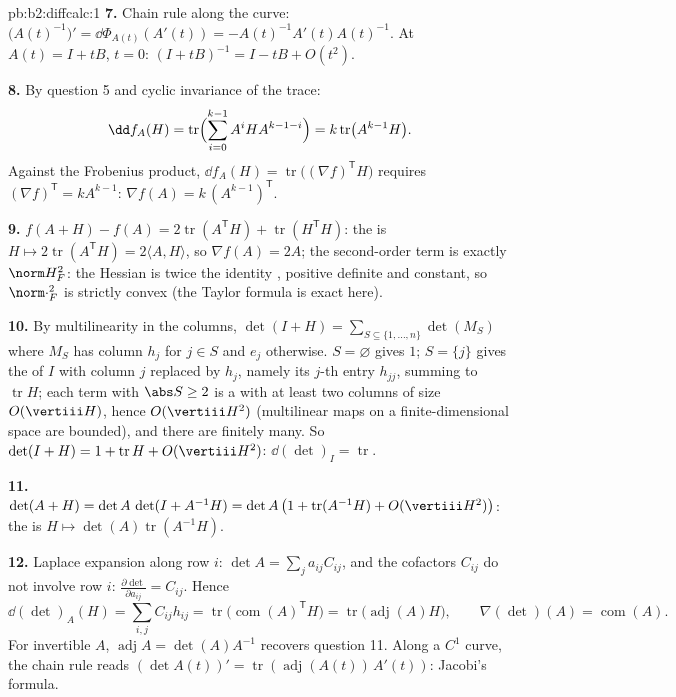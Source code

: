 \begin{solution}{pb:b2:diffcalc:1}
\textbf{7.} Chain rule along the curve:
$\bigl(A(t)^{-1}\bigr)' = \dd\Phi_{A(t)}(A'(t)) =
-A(t)^{-1}A'(t)A(t)^{-1}$. At $A(t) = I + tB$, $t = 0$: $(I +
tB)^{-1} = I - tB + O(t^2)$.

\textbf{8.} By question 5 and cyclic invariance of the trace:
\[
\dd f_A(H) = \operatorname{tr}\Bigl(\sum_{i=0}^{k-1}
A^iHA^{k-1-i}\Bigr) = k\operatorname{tr}\bigl(A^{k-1}H\bigr) .
\]
Against the Frobenius product, $\dd f_A(H) =
\operatorname{tr}\bigl((\nabla f)^{\mathsf T}H\bigr)$ requires
$(\nabla f)^{\mathsf T} = kA^{k-1}$: $\nabla f(A) =
k\,(A^{k-1})^{\mathsf T}$.

\textbf{9.} $f(A + H) - f(A) = 2\operatorname{tr}
(A^{\mathsf T}H) + \operatorname{tr}(H^{\mathsf T}H)$: the
 is $H \mapsto 2\operatorname{tr}(A^{\mathsf T}H) =
2\langle A, H\rangle$, so $\nabla f(A) = 2A$; the second-order
term is exactly $\norm H_F^2$: the Hessian is twice the
identity , positive definite and constant, so
$\norm\cdot_F^2$ is strictly convex (the Taylor formula is
exact here).

\textbf{10.} By multilinearity in the columns, $\det(I + H) =
\sum_{S\subseteq\{1,\dots,n\}}\det(M_S)$ where $M_S$ has column
$h_j$ for $j \in S$ and $e_j$ otherwise. $S = \varnothing$
gives $1$; $S = \{j\}$ gives the  of $I$ with column
$j$ replaced by $h_j$, namely its $j$-th entry $h_{jj}$,
summing to $\operatorname{tr}H$; each term with $\abs S \geq 2$
is a  with at least two columns of size
$O(\vertiii H)$, hence $O(\vertiii H^2)$ (multilinear maps on a
finite-dimensional space are bounded), and there are finitely
many. So $\det(I + H) = 1 + \operatorname{tr}H +
O(\vertiii H^2)$: $\dd(\det)_I = \operatorname{tr}$.

\textbf{11.} $\det(A + H) = \det A\,\det(I + A^{-1}H) =
\det A\,\bigl(1 + \operatorname{tr}(A^{-1}H) +
O(\vertiii H^2)\bigr)$: the  is $H \mapsto
\det(A)\operatorname{tr}(A^{-1}H)$.

\textbf{12.} Laplace expansion along row $i$: $\det A =
\sum_j a_{ij}C_{ij}$, and the cofactors $C_{ij}$ do not involve
row $i$: $\frac{\partial\det}{\partial a_{ij}} = C_{ij}$. Hence
\[
\dd(\det)_A(H) = \sum_{i,j}C_{ij}h_{ij}
= \operatorname{tr}\bigl(\operatorname{com}(A)^{\mathsf T}
H\bigr)
= \operatorname{tr}\bigl(\operatorname{adj}(A)H\bigr),
\qquad
\nabla(\det)(A) = \operatorname{com}(A) .
\]
For invertible $A$, $\operatorname{adj}A = \det(A)A^{-1}$
recovers question 11. Along a $C^1$ curve, the chain rule reads
$(\det A(t))' = \operatorname{tr}(\operatorname{adj}
(A(t))\,A'(t))$: Jacobi's formula.


\end{solution}
